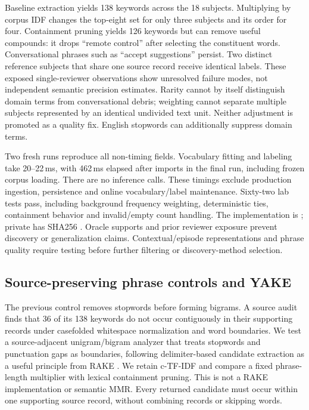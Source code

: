 \documentclass[11pt]{article}
\begin{document}
Baseline extraction yields 138 keywords across the 18 subjects. Multiplying by
corpus IDF changes the top-eight set for only three subjects and its order for
four. Containment pruning yields 126 keywords but can remove useful compounds:
it drops ``remote control'' after selecting the constituent words. Conversational
phrases such as ``accept suggestions'' persist. Two distinct reference subjects
that share one source record receive identical labels. These exposed
single-reviewer observations show unresolved failure modes, not independent
semantic precision estimates. Rarity cannot by itself distinguish domain terms
from conversational debris; weighting cannot separate multiple subjects represented
by an identical undivided text unit. Neither adjustment is promoted as a quality
fix. English stopwords can additionally suppress domain terms.

Two fresh runs reproduce all non-timing fields. Vocabulary fitting and labeling
take 20--22\,ms, with 462\,ms elapsed after imports in the final run, including
frozen corpus loading. There are no inference calls. These timings exclude
production ingestion, persistence and online vocabulary/label maintenance.
Sixty-two lab tests pass, including background frequency weighting, deterministic
ties, containment behavior and invalid/empty count handling. The implementation
is ; private 
has SHA256
.
Oracle supports and prior reviewer exposure prevent discovery or generalization
claims. Contextual/episode representations and phrase quality require testing
before further filtering or discovery-method selection.

\subsection{Source-preserving phrase controls and YAKE}
The previous control removes stopwords before forming bigrams. A source audit
finds that 36 of its 138 keywords do not occur contiguously in their supporting
records under casefolded whitespace normalization and word boundaries. We test a
source-adjacent unigram/bigram analyzer that treats stopwords and punctuation
gaps as boundaries, following delimiter-based candidate extraction as a useful
principle from RAKE \cite{rake}. We retain c-TF-IDF and compare a fixed
phrase-length multiplier with lexical containment pruning. This is not a RAKE
implementation or semantic MMR. Every returned candidate must occur within one
supporting source record, without combining records or skipping words.
\end{document}
